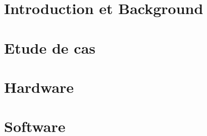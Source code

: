 \documentclass[a4paper,12pt]{report}
\begin{document}
 





\tableofcontents
\listoffigures

\part{Introduction et Background}




\part{Etude de cas}

\part{Hardware}

\part{Software}





\end{document}
